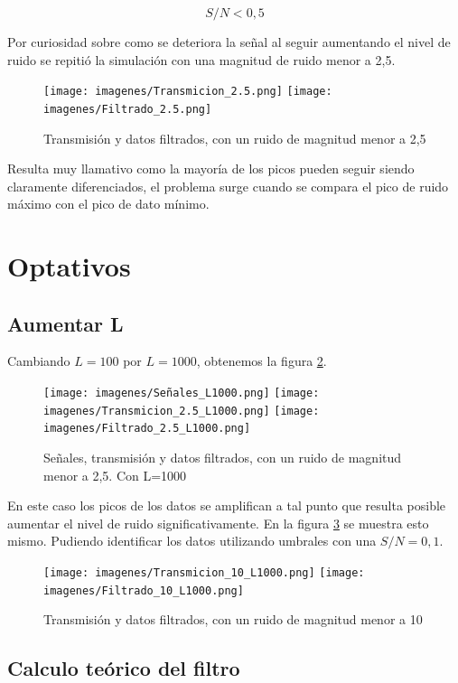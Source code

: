 \documentclass[12pt,letterpaper]{article}     %
\begin{document}
\begin{equation}
	S/N < 0,5
\end{equation}

Por curiosidad sobre como se deteriora la señal al seguir aumentando el nivel de ruido se repitió
la simulación con una magnitud de ruido menor a 2,5.

\begin{figure}[!ht]
\centering
\texttt{[image: imagenes/Transmicion\_2.5.png]}
\texttt{[image: imagenes/Filtrado\_2.5.png]}
\caption{Transmisión y datos filtrados, con un ruido de magnitud menor a 2,5}
\label{fig:filtro25}
\end{figure}

Resulta muy llamativo como la mayoría de los picos pueden seguir siendo claramente diferenciados, 
el problema surge cuando se compara el pico de ruido máximo con el pico de dato mínimo. 

\clearpage
\section{Optativos}
\subsection{Aumentar L}

Cambiando $L=100$ por $L=1000$, obtenemos la figura \ref{fig:L1000}.

\begin{figure}[!ht]
\centering
\texttt{[image: imagenes/Señales\_L1000.png]}
\texttt{[image: imagenes/Transmicion\_2.5\_L1000.png]}
\texttt{[image: imagenes/Filtrado\_2.5\_L1000.png]}
\caption{Señales, transmisión y datos filtrados, con un ruido de magnitud menor a 2,5. Con L=1000}
\label{fig:L1000}
\end{figure}

En este caso los picos de los datos se amplifican a tal punto que resulta posible aumentar el nivel de ruido
significativamente. En la figura \ref{fig:Ruido10} se muestra esto mismo. Pudiendo identificar los datos 
utilizando umbrales con una $S/N = 0,1$.

\begin{figure}[!ht]
\centering
\texttt{[image: imagenes/Transmicion\_10\_L1000.png]}
\texttt{[image: imagenes/Filtrado\_10\_L1000.png]}
\caption{Transmisión y datos filtrados, con un ruido de magnitud menor a 10}
\label{fig:Ruido10}
\end{figure}

\subsection{Calculo teórico del filtro}
\end{document}
